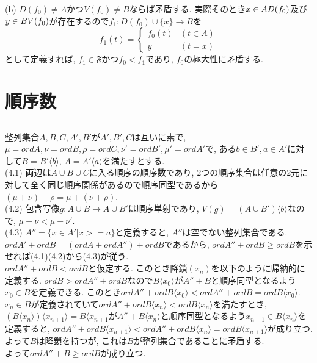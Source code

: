 \documentclass{jsarticle}
\begin{document}
(b) $D(f_0) \neq A$かつ$V(f_0) \neq B$ならば矛盾する. 実際そのとき$x \in A\\D(f_0)$及び$y \in B\\V(f_0)$が存在するので$f_1:D(f_0) \cup \{x\} \rightarrow B$を
\begin{equation*}
	f_1(t) = \begin{cases}
		f_0(t) & (t \in A)\\
		y & (t = x)
	\end{cases}
\end{equation*}
として定義すれば, $f_1 \in \mathfrak{F}$かつ$f_0 < f_1$であり, $f_0$の極大性に矛盾する.

\section{順序数} %
\subsection{} %
整列集合$A, B, C, A', B'$が$A', B', C$は互いに素で, $\mu = ord A, \nu = ord B, \rho = ord C, \nu' = ord B', \mu' = ord A'$で, ある$b \in B', a \in A'$に対して$B = B'\langle b \rangle$, $A = A'\langle a \rangle$を満たすとする.\\
(4.1) 両辺は$A \cup B \cup C$に入る順序の順序数であり, 2つの順序集合は任意の2元に対して全く同じ順序関係があるので順序同型であるから$(\mu + \nu) + \rho = \mu + (\nu + \rho)$.\\
(4.2) 包含写像$g:A \cup B \rightarrow A \cup B'$は順序単射であり, $V(g) = (A \cup B')\langle b \rangle$なので, $\mu + \nu < \mu + \nu'$.\\
(4.3) $A'' = \{x \in A' | x >= a\}$と定義すると, $A''$は空でない整列集合である. $ord A' + ord B = (ord A + ord A'') + ord B$であるから, $ord A'' + ord B \ge ord B$を示せれば(4.1)(4.2)から(4.3)が従う.\\
$ord A'' + ord B < ord B$と仮定する. このとき降鎖$(x_n)$を以下のように帰納的に定義する. $ord B > ord A'' + ord B$なので$B\langle x_0 \rangle$が$A'' + B$と順序同型となるよう$x_0 \in B$を定義できる. このとき$ord A'' + ord B\langle x_0 \rangle < ord A'' + ord B = ord B\langle x_0 \rangle$. $x_n \in B$が定義されていて$ord A'' + ord B\langle x_n \rangle < ord B\langle x_n \rangle$を満たすとき, $(B\langle x_{n} \rangle)\langle x_{n + 1} \rangle = B\langle x_{n + 1}$が$A'' + B\langle x_n \rangle$と順序同型となるよう$x_{n + 1} \in B\langle x_n \rangle$を定義すると, $ord A'' + ord B\langle x_{n + 1} \rangle < ord A'' + ord B\langle x_{n} \rangle = ord B\langle x_{n + 1}\rangle$が成り立つ. よって$B$は降鎖を持つが, これは$B$が整列集合であることに矛盾する.\\
よって$ord A'' + B \ge ord B$が成り立つ.
\end{document}
